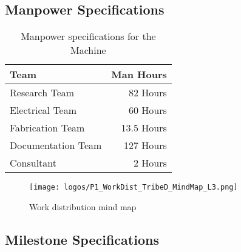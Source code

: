\documentclass[table,french,english]{rapportCS}
\begin{document}
\subsection{Manpower Specifications}\label{sec:mpspecs}
\begin{table}[h]
\begin{center}
\begin{tabular}{|p{8cm}|r|}

    \hline
    \textbf{Team} & \textbf{Man Hours} \\
    \hline
    Research Team & 82 Hours \\
    \hline
    Electrical Team & 60 Hours \\
    \hline
    Fabrication Team & 13.5 Hours \\
    \hline
    Documentation Team & 127 Hours \\
    \hline
    Consultant & 2 Hours \\
    \hline
\end{tabular}
\caption{Manpower specifications for the Machine}
\end{center}
\end{table}
\begin{figure}[h]
    \centering
    \texttt{[image: logos/P1\_WorkDist\_TribeD\_MindMap\_L3.png]}
    \caption{Work distribution mind map}
    \label{fig:specsmindmap}
\end{figure}

\subsection{Milestone Specifications}\label{sec:msspecs}
\end{document}
